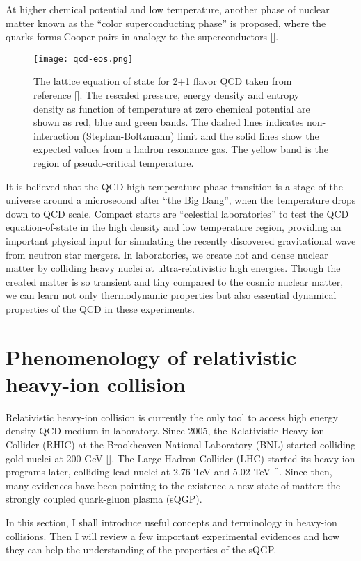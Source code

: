 At higher chemical potential and low temperature, another phase of nuclear matter known as the ``color superconducting phase'' is proposed, where the quarks forms Cooper pairs in analogy to the superconductors [].

\begin{figure}
    \centering
    \texttt{[image: qcd-eos.png]}
    \caption{The lattice equation of state for 2+1 flavor QCD taken from reference []. The rescaled pressure, energy density and entropy density as function of temperature at zero chemical potential are shown as red, blue and green bands. The dashed lines indicates non-interaction (Stephan-Boltzmann) limit and the solid lines show the expected values from a hadron resonance gas. The yellow band is the region of pseudo-critical temperature.}
    \label{fig:qcd_eos}
\end{figure}

It is believed that the QCD high-temperature phase-transition is a stage of the universe around a microsecond after ``the Big Bang'', when the temperature drops down to QCD scale.
Compact starts are ``celestial laboratories'' to test the QCD equation-of-state in the high density and low temperature region, providing an important physical input for simulating the recently discovered gravitational wave from neutron star mergers.
In laboratories, we create hot and dense nuclear matter by colliding heavy nuclei at ultra-relativistic high energies.
Though the created matter is so transient and tiny compared to the cosmic nuclear matter, we can learn not only thermodynamic properties but also essential dynamical properties of the QCD in these experiments.

\section{Phenomenology of relativistic heavy-ion collision}
Relativistic heavy-ion collision is currently the only tool to access high energy density QCD medium in laboratory.
Since 2005, the Relativistic Heavy-ion Collider (RHIC) at the Brookheaven National Laboratory (BNL) started colliding gold nuclei at 200 GeV []. 
The Large Hadron Collider (LHC) started its heavy ion programs later, colliding lead nuclei at 2.76 TeV and 5.02 TeV [].
Since then, many evidences have been pointing to the existence a new state-of-matter: the strongly coupled quark-gluon plasma (sQGP).

In this section, I shall introduce useful concepts and terminology in heavy-ion collisions.
Then I will review a few important experimental evidences and how they can help the understanding of the properties of the sQGP.

